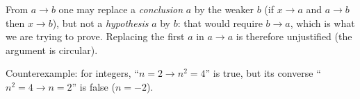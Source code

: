 From $a\rightarrow b$ one may replace a \emph{conclusion} $a$ by the weaker $b$ (if $x\rightarrow a$ and $a\rightarrow b$ then $x\rightarrow b$), but not a \emph{hypothesis} $a$ by $b$: that would require $b\rightarrow a$, which is what we are trying to prove. Replacing the first $a$ in $a\rightarrow a$ is therefore unjustified (the argument is circular).

Counterexample: for integers, ``$n=2\rightarrow n^2=4$'' is true, but its converse ``$n^2=4\rightarrow n=2$'' is false ($n=-2$).
